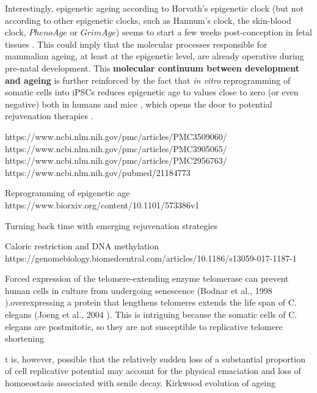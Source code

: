 Interestingly, epigenetic ageing according to Horvath's epigenetic clock (but not according to other epigenetic clocks, such as Hannum's clock, the skin-blood clock, $PhenoAge$ or $GrimAge$) seems to start a few weeks post-conception in fetal tissues \cite{Hoshino2019}. This could imply that the molecular processes responsible for mammalian ageing, at least at the epigenetic level, are already operative during pre-natal development. This \textbf{molecular continuum between development and ageing} is further reinforced by the fact that \textit{in vitro} reprogramming of somatic cells into \acrshort{iPSCs} reduces epigenetic age to values close to zero (or even negative) both in humans \cite{Horvath2013} and mice \cite{Petkovich2017,Meer2018}, which opens the door to potential rejuvenation therapies \cite{Rando2012,Olova2019}. 

https://www.ncbi.nlm.nih.gov/pmc/articles/PMC3509060/
https://www.ncbi.nlm.nih.gov/pmc/articles/PMC3905065/
https://www.ncbi.nlm.nih.gov/pmc/articles/PMC2956763/
https://www.ncbi.nlm.nih.gov/pubmed/21184773

Reprogramming of epigenetic age
https://www.biorxiv.org/content/10.1101/573386v1


Turning back time with emerging rejuvenation strategies

Caloric restriction and DNA methylation https://genomebiology.biomedcentral.com/articles/10.1186/s13059-017-1187-1


Forced expression of the telomere-extending enzyme telomerase can prevent human cells in culture from undergoing senescence (Bodnar et al., 1998
).overexpressing a protein that lengthens telomeres extends the life span of C. elegans (Joeng et al., 2004
). This is intriguing because the somatic cells of C. elegans are postmitotic, so they are not susceptible to replicative telomere shortening

t is, however, possible that the relatively sudden loss of a substantial proportion of cell replicative potential may account for the physical emaciation and loss of homoeostasis associated with senile decay. Kirkwood evolution of ageing


